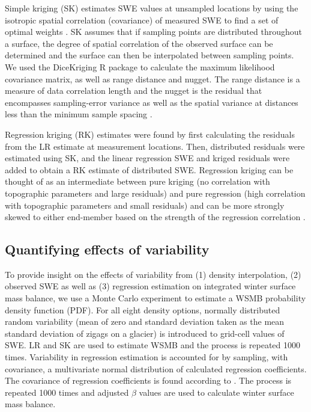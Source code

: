 \documentclass[twocolumn,letterpaper]{igs}
\begin{document}
Simple kriging (SK) estimates SWE values at unsampled locations by using the isotropic spatial correlation (covariance) of measured SWE to find a set of optimal weights \citep{Davis1986, Li2008}. SK assumes that if sampling points are distributed throughout a surface, the degree of spatial correlation of the observed surface can be determined and the surface can then be interpolated between sampling points. We used the DiceKriging R package \citep{Roustant2012} to calculate the maximum likelihood covariance matrix, as well as range distance and nugget. The range distance is a measure of data correlation length and the nugget is the residual that encompasses sampling-error variance as well as the spatial variance at distances less than the minimum sample spacing \citep{Li2008}. 

Regression kriging (RK) \citep{Hengl2007} estimates were found by first calculating the residuals from the LR estimate at measurement locations. Then, distributed residuals were estimated using SK, and the linear regression SWE and kriged residuals were added to obtain a RK estimate of distributed SWE. Regression kriging can be thought of as an intermediate between pure kriging (no correlation with topographic parameters and large residuals) and pure regression (high correlation with topographic parameters and small residuals) and can be more strongly skewed to either end-member based on the strength of the regression correlation \citep{Hengl2007}.

\subsection{Quantifying effects of variability}

To provide insight on the effects of variability from (1) density interpolation, (2) observed SWE as well as (3) regression estimation on integrated winter surface mass balance, we use a Monte Carlo experiment \citep{Metropolis1949} to estimate a WSMB probability density function (PDF). For all eight density options, normally distributed random variability (mean of zero and standard deviation taken as the mean standard deviation of zigags on a glacier) is introduced to grid-cell values of SWE. LR and SK are used to estimate WSMB and the process is repeated 1000 times.  Variability in regression estimation is accounted for by sampling, with covariance, a multivariate normal distribution of calculated regression coefficients. The covariance of regression coefficients is found according to \cite{Bagos2015}. The process is repeated 1000 times and adjusted $\beta$ values are used to calculate winter surface mass balance. 
\end{document}
